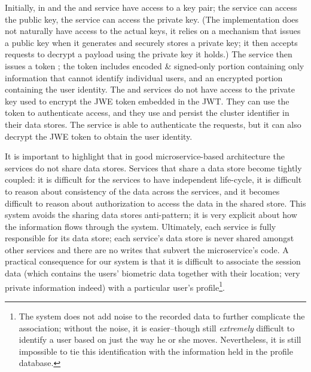 
Initially, in  and  the  and  service have access to a key pair; the  service can access the public key, the  service can access the private key. (The implementation does not naturally have access to the actual keys, it relies on a mechanism that issues a public key when it generates and securely stores a private key; it then accepts requests to decrypt a payload using the private key it holds.) The  service then issues a token ; the token includes encoded \& signed-only portion containing only information that cannot identify individual users, and an encrypted portion containing the user identity. The   and   services do not have access to the private key used to encrypt the JWE token embedded in the JWT. They can use the token to authenticate access, and they use and persist the cluster identifier in their data stores. The   service is able to authenticate the requests, but it can also decrypt the JWE token to obtain the user identity.

It is important to highlight that in good microservice-based architecture the services do not share data stores. Services that share a data store become tightly coupled: it is difficult for the services to have independent life-cycle, it is difficult to reason about consistency of the data across the services, and it becomes difficult to reason about authorization to access the data in the shared store.
This system avoids the sharing data stores anti-pattern; it is very explicit about how the information flows through the system. Ultimately, each service is fully responsible for its data store; each service's data store is never shared amongst other services and there are no writes that subvert the microservice's code.
A practical consequence for our system is that it is difficult to associate the session data (which contains the users' biometric data together with their location; very private information indeed) with a particular user's profile\footnote{The system does not add noise to the recorded data to further complicate the association; without the noise, it is easier--though still \emph{extremely} difficult to identify a user based on just the way he or she moves. Nevertheless, it is still impossible to tie this identification with the information held in the profile database.}. 

